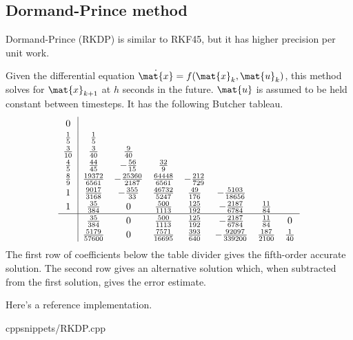 \subsection{Dormand-Prince method}

Dormand-Prince (RKDP) is similar to RKF45, but it has higher precision per unit
work.
\begin{theorem}
  Given the differential equation $\dot{\mat{x}} = f(\mat{x}_k, \mat{u}_k)$,
  this method solves for $\mat{x}_{k+1}$ at $h$ seconds in the future.
  $\mat{u}$ is assumed to be held constant between timesteps. It has the
  following Butcher tableau.
  \begin{equation*}
    \renewcommand\arraystretch{1.2}
    \begin{array}{c|ccccccc}
      0 \\
      \frac{1}{5} & \frac{1}{5} \\
      \frac{3}{10} & \frac{3}{40} & \frac{9}{40} \\
      \frac{4}{5} & \frac{44}{45} & -\frac{56}{15} & \frac{32}{9} \\
      \frac{8}{9} & \frac{19372}{6561} & -\frac{25360}{2187} &
        \frac{64448}{6561} & -\frac{212}{729} \\
      1 & \frac{9017}{3168} & -\frac{355}{33} & \frac{46732}{5247} &
        \frac{49}{176} & -\frac{5103}{18656} \\
      1 & \frac{35}{384} & 0 & \frac{500}{1113} & \frac{125}{192} &
        -\frac{2187}{6784} & \frac{11}{84} \\
      \hline
      & \frac{35}{384} & 0 & \frac{500}{1113} & \frac{125}{192} &
        -\frac{2187}{6784} & \frac{11}{84} & 0 \\
      & \frac{5179}{57600} & 0 & \frac{7571}{16695} & \frac{393}{640} &
        -\frac{92097}{339200} & \frac{187}{2100} & \frac{1}{40}
    \end{array}
  \end{equation*}
  The first row of coefficients below the table divider gives the fifth-order
  accurate solution. The second row gives an alternative solution which,
  when subtracted from the first solution, gives the error estimate.
\end{theorem}

Here's a reference implementation.
\begin{coderemote}{cpp}{snippets/RKDP.cpp}
  \caption{RKDP implementation in C++}
\end{coderemote}
